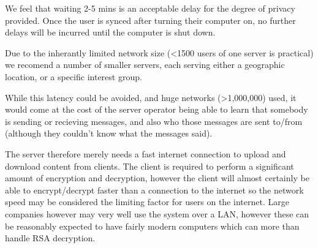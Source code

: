 We feel that waiting 2-5 mins is an acceptable delay for the degree of privacy
provided. Once the user is synced after turning their computer on, no further
delays will be incurred until the computer is shut down.

Due to the inherantly limited network size (\textless1500 users of one server is
practical) we recomend a number of smaller servers, each serving either a
geographic location, or a specific interest group.

While this latency could be avoided, and huge networks (\textgreater1,000,000)
used, it would come at the cost of the server operator being able to learn that
somebody is sending or recieving messages, and also who those messages are sent
to/from (although they couldn't know what the messages said).

The server therefore merely needs a fast internet connection to upload and
download content from clients. The client is required to perform a significant
amount of encryption and decryption, however the client will almost certainly be
able to encrypt/decrypt faster than a connection to the internet so the network
speed may be considered the limiting factor for users on the internet. Large
companies however may very well use the system over a LAN, however these can be
reasonably expected to have fairly modern computers which can more than handle
RSA decryption.
